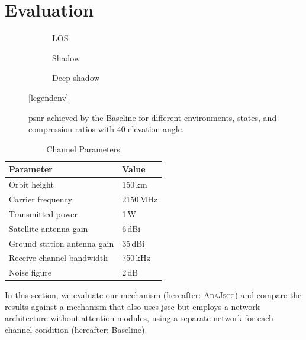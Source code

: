 \documentclass[conference]{IEEEtran}
\newcommand\ours{\textsc{AdaJscc}\xspace}
\newcommand\baseline{Baseline\xspace}
\begin{document}
\section{Evaluation}
\label{sec:evaluation}

\begin{figure}
  \begin{subfigure}{.32\linewidth}
  \centering
  
  \caption{LOS}
  \label{subfig:baseline_los}
\end{subfigure}
\hfill
\begin{subfigure}{.32\linewidth}
  \centering
  
  \caption{Shadow}
  \label{subfig:baseline_shadow}
\end{subfigure}
\hfill
\begin{subfigure}{.32\linewidth}
  \centering
  
  \caption{Deep shadow}
  \label{subfig:baseline_deep_shadow}
\end{subfigure}

\vspace{1em}
\centering
\ref{legendenv}

\caption{\ac{psnr} achieved by the \baseline for different environments, states, and compression ratios with 40\textdegree{} elevation angle.}
\label{fig:different_scenes_40}
\end{figure}

\begin{table}[b!]
  \caption{Channel Parameters}
  \label{tab:channel_parameters}

  \centering
	\begin{tabular}{ll}
		\toprule
    Parameter & Value \\
    \midrule
		Orbit height & 150\,km \\
		Carrier frequency & 2150\,MHz \\
    Transmitted power & 1\,W \\
    Satellite antenna gain & 6\,dBi \\
    Ground station antenna gain & 35\,dBi \\
		Receive channel bandwidth & 750\,kHz \\
		Noise figure & 2\,dB \\
		\bottomrule
	\end{tabular}
\end{table}

In this section, we evaluate our mechanism (hereafter: \ours) and compare the results against a mechanism that also uses \ac{jscc} but employs a network architecture without attention modules, using a separate network for each channel condition (hereafter: \baseline).
\end{document}
